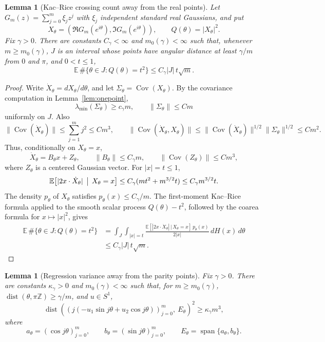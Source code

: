 \documentclass[11pt]{amsart}
\numberwithin{equation}{section}
\newtheorem{lemma}[theorem]{Lemma}
\theoremstyle{definition}
\theoremstyle{remark}
\newcommand{\Exp}{\mathbb E}
\newcommand{\Cov}{\operatorname{Cov}}
\newcommand{\dist}{\operatorname{dist}}
\begin{document}
\begin{lemma}[Kac--Rice crossing count away from the real points]\label{lem:kr-crossing}
Let \(G_m(z)=\sum_{j=0}^m\xi_jz^j\) with \(\xi_j\) independent standard real
Gaussians, and put
\[
  X_\theta=(\Re G_m(e^{i\theta}),\Im G_m(e^{i\theta})),
  \qquad Q(\theta)=|X_\theta|^2 .
\]
Fix \(\gamma>0\).  There are constants \(C_\gamma<\infty\) and
\(m_0(\gamma)<\infty\) such that, whenever \(m\ge m_0(\gamma)\), \(J\) is an
interval whose points have angular distance at least \(\gamma/m\) from \(0\)
and \(\pi\), and \(0<t\le1\),
\[
  \Exp\,\#\{\theta\in J:Q(\theta)=t^2\}
  \le C_\gamma |J|\,t\sqrt m .
\]
\end{lemma}

\begin{proof}
Write \(\dot X_\theta=dX_\theta/d\theta\), and let
\(\Sigma_\theta=\Cov(X_\theta)\).  By the covariance computation in
Lemma~\ref{lem:onepoint},
\[
  \lambda_{\min}(\Sigma_\theta)\ge c_\gamma m,
  \qquad \|\Sigma_\theta\|\le Cm
\]
uniformly on \(J\).  Also
\[
  \|\Cov(\dot X_\theta)\|\le\sum_{j=1}^m j^2\le Cm^3,
  \qquad
  \|\Cov(\dot X_\theta,X_\theta)\|
  \le \|\Cov(\dot X_\theta)\|^{1/2}\|\Sigma_\theta\|^{1/2}\le Cm^2 .
\]
Thus, conditionally on \(X_\theta=x\),
\[
  \dot X_\theta=B_\theta x+Z_\theta,\qquad
  \|B_\theta\|\le C_\gamma m,\qquad
  \|\Cov(Z_\theta)\|\le Cm^3 ,
\]
where \(Z_\theta\) is a centered Gaussian vector.  For \(|x|=t\le1\),
\[
  \Exp\bigl[|2x\cdot\dot X_\theta|\,\bigm|\,X_\theta=x\bigr]
  \le C_\gamma(mt^2+m^{3/2}t)
  \le C_\gamma m^{3/2}t .
\]
The density \(p_\theta\) of \(X_\theta\) satisfies \(p_\theta(x)\le C_\gamma/m\).
The first-moment Kac--Rice formula applied to the smooth scalar process
\(Q(\theta)-t^2\), followed by the coarea formula for \(x\mapsto |x|^2\), gives
\[
\begin{aligned}
  \Exp\,\#\{\theta\in J:Q(\theta)=t^2\}
  &=
  \int_J\int_{|x|=t}
  \frac{\Exp[|2x\cdot\dot X_\theta|\,|\,X_\theta=x]\,p_\theta(x)}
       {2|x|}\,dH(x)\,d\theta  \\
  &\le C_\gamma |J|\,t\sqrt m .
\end{aligned}
\]
\end{proof}

\begin{lemma}[Regression variance away from the parity points]\label{lem:kr-regression-lower}
Fix \(\gamma>0\).  There are constants \(\kappa_\gamma>0\) and
\(m_0(\gamma)<\infty\) such that, for \(m\ge m_0(\gamma)\),
\(\dist(\theta,\pi\mathbb Z)\ge\gamma/m\), and \(u\in S^1\),
\[
 \operatorname{dist}\!\left(
   (j(-u_1\sin j\theta+u_2\cos j\theta))_{j=0}^m,\ E_\theta
 \right)^2
 \ge \kappa_\gamma m^3,
\]
where
\[
a_\theta=(\cos j\theta)_{j=0}^m,\qquad
b_\theta=(\sin j\theta)_{j=0}^m,\qquad
E_\theta=\operatorname{span}\{a_\theta,b_\theta\}.
\]
\end{lemma}
\end{document}
